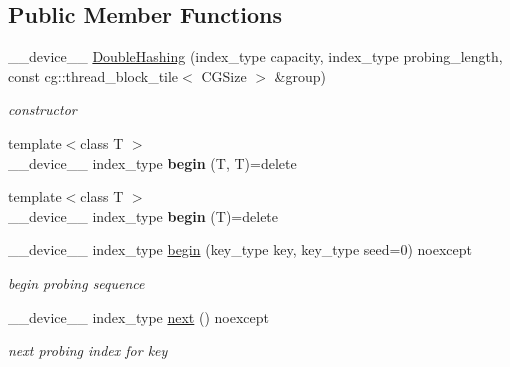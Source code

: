 \subsection*{Public Member Functions}
\begin{DoxyCompactItemize}
\item 
\+\_\+\+\_\+device\+\_\+\+\_\+ \hyperlink{classwarpcore_1_1probing__schemes_1_1DoubleHashing_aa74ed01c96665a5651ad4dc1395da1d2}{Double\+Hashing} (index\+\_\+type capacity, index\+\_\+type probing\+\_\+length, const cg\+::thread\+\_\+block\+\_\+tile$<$ C\+G\+Size $>$ \&group)
\begin{DoxyCompactList}\small\item\em constructor \end{DoxyCompactList}\item 
\mbox{\label{classwarpcore_1_1probing__schemes_1_1DoubleHashing_ab99320ff4f7ca5b001b38c657eee8f45}} 
{\footnotesize template$<$class T $>$ }\\\+\_\+\+\_\+device\+\_\+\+\_\+ index\+\_\+type {\bfseries begin} (T, T)=delete
\item 
\mbox{\label{classwarpcore_1_1probing__schemes_1_1DoubleHashing_aa7def8460dd3b81b53577401ef79dcaf}} 
{\footnotesize template$<$class T $>$ }\\\+\_\+\+\_\+device\+\_\+\+\_\+ index\+\_\+type {\bfseries begin} (T)=delete
\item 
\+\_\+\+\_\+device\+\_\+\+\_\+ index\+\_\+type \hyperlink{classwarpcore_1_1probing__schemes_1_1DoubleHashing_abd3749c428220cad1193fc9b2994d545}{begin} (key\+\_\+type key, key\+\_\+type seed=0) noexcept
\begin{DoxyCompactList}\small\item\em begin probing sequence \end{DoxyCompactList}\item 
\+\_\+\+\_\+device\+\_\+\+\_\+ index\+\_\+type \hyperlink{classwarpcore_1_1probing__schemes_1_1DoubleHashing_a49bf8de6c8af2e84d335e62a864a1a75}{next} () noexcept
\begin{DoxyCompactList}\small\item\em next probing index for {\ttfamily key} \end{DoxyCompactList}\end{DoxyCompactItemize}

